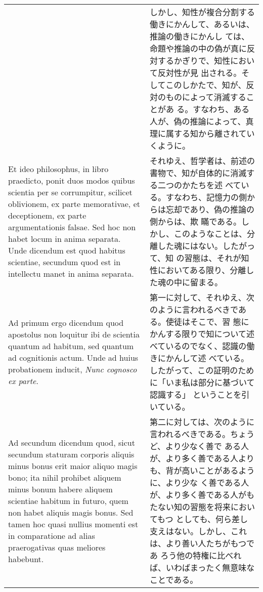 \documentclass[10pt]{jsarticle} %
\begin{document}
\begin{longtable}{p{21em}p{21em}}
&

しかし、知性が複合分割する働きにかんして、あるいは、推論の働きにかんし
ては、命題や推論の中の偽が真に反対するかぎりで、知性において反対性が見
出される。そしてこのしかたで、知が、反対のものによって消滅することがあ
る。すなわち、ある人が、偽の推論によって、真理に属する知から離されてい
くように。


\\


Et ideo philosophus, in libro praedicto, ponit duos modos quibus
scientia per se corrumpitur, scilicet oblivionem, ex parte
memorativae, et deceptionem, ex parte argumentationis falsae. Sed hoc
non habet locum in anima separata. Unde dicendum est quod habitus
scientiae, secundum quod est in intellectu manet in anima separata.

&

それゆえ、哲学者は、前述の書物で、知が自体的に消滅する二つのかたちを述
べている。すなわち、記憶力の側からは忘却であり、偽の推論の側からは、欺
瞞である。しかし、このようなことは、分離した魂にはない。したがって、知
の習態は、それが知性においてある限り、分離した魂の中に留まる。

\\


{\sc Ad primum ergo dicendum} quod apostolus non loquitur ibi de
scientia quantum ad habitum, sed quantum ad cognitionis actum. Unde ad
huius probationem inducit, {\it Nunc cognosco ex parte}.


&

第一に対して、それゆえ、次のように言われるべきである。使徒はそこで、習
態にかんする限りで知について述べているのでなく、認識の働きにかんして述
べている。したがって、この証明のために「いま私は部分に基づいて認識する」
ということを引いている。

\\


{\sc Ad secundum dicendum} quod, sicut secundum staturam
corporis aliquis minus bonus erit maior aliquo magis bono; ita nihil
prohibet aliquem minus bonum habere aliquem scientiae habitum in
futuro, quem non habet aliquis magis bonus. Sed tamen hoc quasi
nullius momenti est in comparatione ad alias praerogativas quas
meliores habebunt.


&

第二に対しては、次のように言われるべきである。ちょうど、より少なく善で
ある人が、より多く善である人よりも、背が高いことがあるように、より少な
く善である人が、より多く善である人がもたない知の習態を将来においてもつ
としても、何ら差し支えはない。しかし、これは、より善い人たちがもつであ
ろう他の特権に比べれば、いわばまったく無意味なことである。


\end{longtable}
\end{document}
